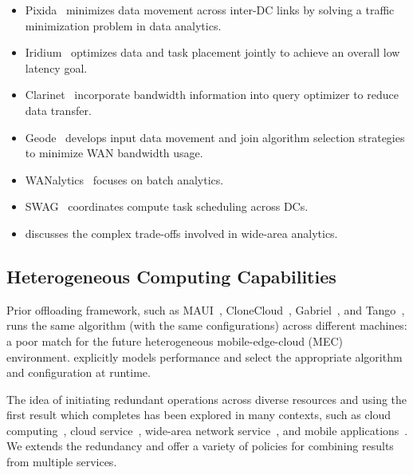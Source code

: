 \documentclass[thesis.tex]{subfiles}
\begin{document}
\begin{itemize}
\item Pixida~\cite{kloudas2015pixida} minimizes data movement across inter-DC
  links by solving a traffic minimization problem in data analytics.

\item Iridium~\cite{pu2015low} optimizes data and task placement jointly to
  achieve an overall low latency goal.

\item Clarinet~\cite{viswanathan2016clarinet} incorporate bandwidth information
  into query optimizer to reduce data transfer.

\item Geode~\cite{vulimiri2015global} develops input data movement and join
  algorithm selection strategies to minimize WAN bandwidth usage.

\item WANalytics~\cite{vulimiri2015wananlytics} focuses on batch analytics.

\item SWAG~\cite{hung2015scheduling} coordinates compute task scheduling across
  DCs.

\item \cite{heintz2015towards} discusses the complex trade-offs involved in
  wide-area analytics.

\end{itemize}

\subsection{Heterogeneous Computing Capabilities}
\label{sec:heter-proc-capab}

Prior offloading framework, such as MAUI~\cite{cuervo2010maui},
CloneCloud~\cite{chun2011clonecloud}, Gabriel~\cite{ha2014towards}, and
Tango~\cite{gordon2015accelerating}, runs the same algorithm (with the same
configurations) across different machines: a poor match for the future
heterogeneous mobile-edge-cloud (MEC) environment. \sysname{} explicitly models
performance and select the appropriate algorithm and configuration at runtime.

 The idea of initiating redundant operations
across diverse resources and using the first result which completes has been
explored in many contexts, such as cloud
computing~\cite{ananthanarayanan2013effective}, cloud
service~\cite{dean2013tail}, wide-area network service~\cite{vulimiri2013low},
and mobile applications~\cite{gordon2015accelerating}. We extends the redundancy
and offer a variety of policies for combining results from multiple services.
\end{document}
